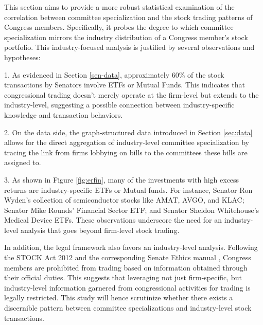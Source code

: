 \documentclass[15pt,letterpaper]{article}
\begin{document}
This section aims to provide a more robust statistical examination of the correlation between committee specialization and the stock trading patterns of Congress members. Specifically, it probes the degree to which committee specialization mirrors the industry distribution of a Congress member's stock portfolio. This industry-focused analysis is justified by several observations and hypotheses:

1. As evidenced in Section \ref{sen-data}, approximately 60\% of the stock transactions by Senators involve ETFs or Mutual Funds. This indicates that congressional trading doesn't merely operate at the firm-level but extends to the industry-level, suggesting a possible connection between industry-specific knowledge and transaction behaviors.

2. On the data side, the graph-structured data introduced in Section \ref{sec:data} allows for the direct aggregation of industry-level committee specialization by tracing the link from firms lobbying on bills to the committees these bills are assigned to.

3. As shown in Figure \ref{fig:erfin}, many of the investments with high excess returns are industry-specific ETFs or Mutual funds. For instance, Senator Ron Wyden's collection of semiconductor stocks like AMAT, AVGO, and KLAC; Senator Mike Rounds' Financial Sector ETF; and Senator Sheldon Whitehouse's Medical Device ETFs. These observations underscore the need for an industry-level analysis that goes beyond firm-level stock trading.

In addition, the legal framework also favors an industry-level analysis. Following the STOCK Act 2012 and the corresponding Senate Ethics manual \citep{Boxer2012}, Congress members are prohibited from trading based on information obtained through their official duties. This suggests that leveraging not just firm-specific, but industry-level information garnered from congressional activities for trading is legally restricted. This study will hence scrutinize whether there exists a discernible pattern between committee specializations and industry-level stock transactions.
\end{document}
